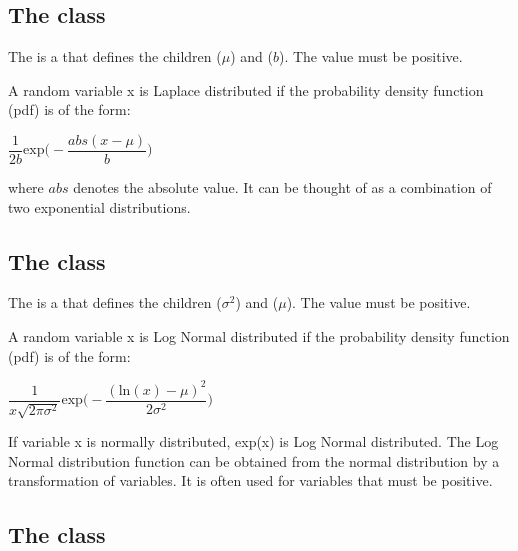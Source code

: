 \subsection{The  class}
\label{LaplaceDistribution-class}
\label{laplacedistribution-class}

The \LaplaceDistribution is a \ContinuousUnivariateDistribution that defines the \UncertValue children  ($\mu$) and  ($b$).  The  value must be positive.

A random variable x is Laplace distributed if the probability density function (pdf) is of the form:

\begin{center}
$\dfrac{1}{2b}\mathrm{exp}\bigg(-\dfrac{abs(x-\mu)}{b}\bigg)$
\end{center}

where $abs$ denotes the absolute value. It can be thought of as a combination of two exponential distributions.

\subsection{The  class}
\label{LogNormalDistribution-class}
\label{lognormaldistribution-class}

The \LogNormalDistribution is a \ContinuousUnivariateDistribution that defines the \UncertValue children  ($\sigma^2$) and  ($\mu$).  The  value must be positive.

A random variable x is Log Normal distributed if the probability density function (pdf) is of the form:

\begin{center}
$\dfrac{1}{x \sqrt{2 \pi \sigma^2}} \mathrm{exp}\bigg(-\dfrac{ (\mathrm{ln}(x)-\mu)^2 }{2 \sigma^2}\bigg)$
\end{center}

If variable x is normally distributed, exp(x) is Log Normal distributed. The Log Normal distribution function can be obtained from the normal distribution by a transformation of variables. It is often used for variables that must be positive.

\subsection{The  class}
\label{LogisticDistribution-class}
\label{logisticdistribution-class}

